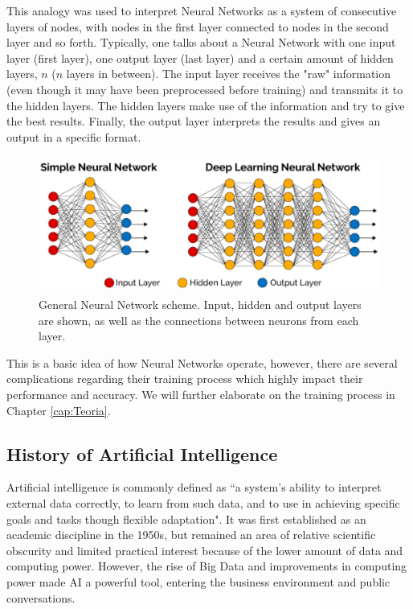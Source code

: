 This analogy was used to interpret Neural Networks as a system of consecutive layers of nodes, with nodes in the first layer connected to nodes in the second layer and so forth. Typically, one talks about a Neural Network with one input layer (first layer), one output layer (last layer) and a certain amount of hidden layers, $n$ ($n$ layers in between). The input layer receives the "raw" information (even though it may have been preprocessed before training) and transmits it to the hidden layers. The hidden layers make use of the information and try to give the best results. Finally, the output layer interprets the results and gives an output in a specific format. 

\begin{figure}[h!]
  \begin{center}
    \includegraphics[width=120mm, height=45mm]{Figuras/NNgenerica.png}\par
    \caption{General Neural Network scheme. Input, hidden and output layers are shown, as well as the connections between neurons from each layer.}
    \label{fig:NNgenerica}
  \end{center}
\end{figure}


This is a basic idea of how Neural Networks operate, however, there are several complications regarding their training process which highly impact their performance and accuracy. We will further elaborate on the training process in Chapter \ref{cap:Teoria}.\\


\subsection{History of Artificial Intelligence} \label{121}
Artificial intelligence is commonly defined as ``a system's ability to interpret external data correctly, to learn from such data, and to use in achieving specific goals and tasks though flexible adaptation". It was first established as an academic discipline in the 1950s, but remained an area of relative scientific obscurity and limited practical interest because of the lower amount of data and computing power. However, the rise of Big Data and improvements in computing power made AI a powerful tool, entering the business environment and public conversations.\\

